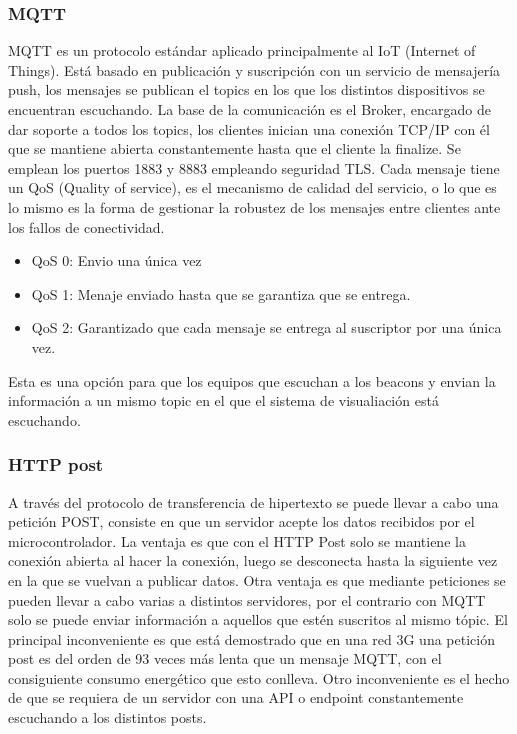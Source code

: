 \documentclass[a4paper ,12pt, onecolumn]{article}
\begin{document}
\begin{enumerate}
        \subsubsection {MQTT}
            MQTT es un protocolo estándar aplicado principalmente al IoT (Internet of Things). Está basado en publicación y 
            suscripción con un servicio de mensajería push, los mensajes se publican el topics en los que los distintos 
            dispositivos se encuentran escuchando.
            La base de la comunicación es el Broker, encargado de dar soporte a todos los topics, los clientes inician una 
            conexión TCP/IP con él que se mantiene abierta constantemente hasta que el cliente la finalize. Se emplean los puertos
            1883 y 8883 empleando seguridad TLS.
            Cada mensaje tiene un QoS (Quality of service), es el mecanismo de calidad del servicio, o lo que es lo mismo es la forma de
            gestionar la robustez de los mensajes entre clientes ante los fallos de conectividad.
            \begin{itemize}
                \item QoS 0: Envio una única vez
                \item QoS 1: Menaje enviado hasta que se garantiza que se entrega.
                \item QoS 2: Garantizado que cada mensaje se entrega al suscriptor por una única vez.
            \end{itemize}
            Esta es una opción para que los equipos que escuchan a los beacons y envian la información a un mismo
            topic en el que el sistema de visualiación está escuchando.
        \subsubsection {HTTP post}
            A través del protocolo de transferencia de hipertexto se puede llevar a cabo una petición POST, consiste en que
            un servidor acepte los datos recibidos por el microcontrolador.
            La ventaja es que con el HTTP Post solo se mantiene la conexión abierta al hacer la conexión, luego se desconecta hasta 
            la siguiente vez en la que se vuelvan a publicar datos. Otra ventaja es que mediante peticiones se pueden llevar a 
            cabo varias a distintos servidores, por el contrario con MQTT solo se puede enviar información a aquellos que estén
            suscritos al mismo tópic.
            El principal inconveniente es que está demostrado que en una red 3G una petición post es del orden de 93 veces
            más lenta que un mensaje MQTT, con el consiguiente consumo energético que esto conlleva. Otro inconveniente es el hecho 
            de que se requiera de un servidor con una API o endpoint constantemente escuchando a los distintos posts.

\end{enumerate}
\end{document}

